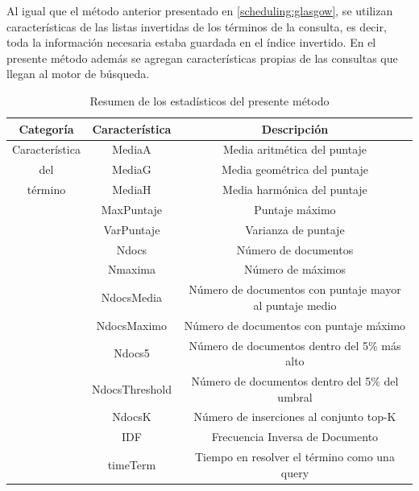Al igual que el método anterior presentado en \ref{scheduling:glasgow}, se utilizan características de las listas invertidas de los términos de la consulta, es decir, toda la información necesaria estaba guardada en el índice invertido. En el presente método además se agregan características propias de las consultas que llegan al motor de búsqueda. 


\begin{table}[!th]
\caption{Resumen de los estadísticos del presente método}
\begin{tabular}{|c|c|c|}
\hline
\textbf{Categoría} & \textbf{Característica} & \textbf{Descripción} \\ \hline
\multicolumn{ 1}{|p{3cm}|}{Característica} & MediaA & Media aritmética del puntaje \\ \cline{ 2- 3}
\multicolumn{ 1}{|p{3cm}|}{del} & MediaG & Media geométrica del puntaje \\ \cline{ 2- 3}
\multicolumn{ 1}{|p{3cm}|}{término} & MediaH & Media harmónica del puntaje \\ \cline{ 2- 3}
\multicolumn{ 1}{|c|}{} & MaxPuntaje & Puntaje máximo \\ \cline{ 2- 3}
\multicolumn{ 1}{|c|}{} & VarPuntaje & Varianza de puntaje \\ \cline{ 2- 3}
\multicolumn{ 1}{|c|}{} & Ndocs & Número de documentos \\ \cline{ 2- 3}
\multicolumn{ 1}{|c|}{} & Nmaxima & Número de máximos \\ \cline{ 2- 3}
\multicolumn{ 1}{|c|}{} & NdocsMedia & Número de documentos con puntaje mayor al puntaje medio \\ \cline{ 2- 3}
\multicolumn{ 1}{|c|}{} & NdocsMaximo & Número de documentos con puntaje máximo \\ \cline{ 2- 3}
\multicolumn{ 1}{|c|}{} & Ndocs5 & Número de documentos dentro del 5\% más alto \\ \cline{ 2- 3}
\multicolumn{ 1}{|c|}{} & NdocsThreshold & Número de documentos dentro del 5\% del umbral \\ \cline{ 2- 3}
\multicolumn{ 1}{|c|}{} & NdocsK & Número de inserciones al conjunto top-K \\ \cline{ 2- 3}
\multicolumn{ 1}{|c|}{} & IDF & Frecuencia Inversa de Documento \\ \cline{ 2- 3}
\multicolumn{ 1}{|c|}{} & timeTerm & Tiempo en resolver el término como una query \\ \hline
\end{tabular}
\label{tabla:estadisticosSigir}
\end{table}



